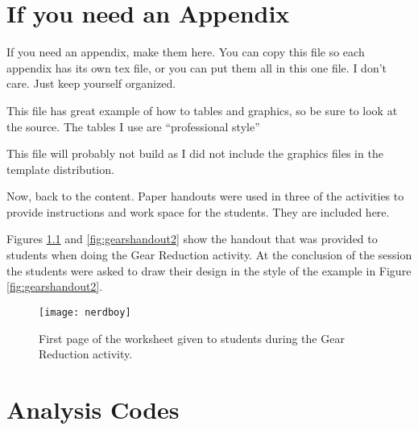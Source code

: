\chapter{If you need an Appendix}

If you need an appendix, make them here. You can copy this file so each appendix has its own tex file, or you can put them all in this one file. I don't care. Just keep yourself organized.

This file has great example of how to tables and graphics, so be sure to look at the source. The tables I use are ``professional style'' 

This file will probably not build as I did not include the graphics files in the template distribution.

Now, back to the content. Paper handouts were used in three of the activities to provide instructions and work space for the students. They are included here.


	\label{sec:gearshandout}
	
	Figures \ref{fig:gearshandout1} and \ref{fig:gearshandout2} show the handout that was provided to students when doing the Gear Reduction activity. At the conclusion of the session the students were asked to draw their design in the style of the example in Figure \ref{fig:gearshandout2}.
	
\setlength\fboxsep{0pt}
\setlength\fboxrule{0.5pt}


	\begin{figure}
	\centering
    \texttt{[image: nerdboy]}
	\caption[Gear Reduction handout, page 1.]{First page of the worksheet given to students during the Gear Reduction activity.}
	\label{fig:gearshandout1}
	\end{figure}

\chapter{Analysis Codes}

